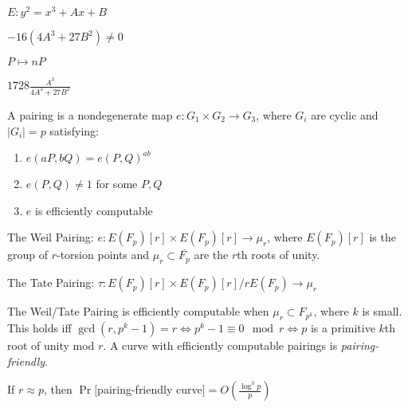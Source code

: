 \documentclass{article}
\newcommand\abs[1]{\left|#1\right|}
\begin{document}
$E: y^2 = x^3 + Ax + B$
\bigskip

$-16(4A^3+27B^2) \ne 0$

\bigskip

$P \mapsto n P$
\bigskip

$1728\frac{A^3}{4A^3+27B^2}$

\bigskip


\noindent A pairing is a nondegenerate map $e: G_1 \times G_2 \to G_3$, where $G_i$ are cyclic and $\abs{G_i} = p$ satisfying:
\begin{enumerate}
\item $e(aP, bQ) = e(P,Q)^{ab}$
\item $e(P,Q) \ne 1$ for some $P,Q$
\item $e$ is efficiently computable
\end{enumerate}

\bigskip

The Weil Pairing: $e: E(F_p)[r] \times E(F_p)[r] \to \mu_r$, where $E(F_p)[r]$ is the group of $r$-torsion points and $\mu_r \subset \overline{F_p}$ are the $r$th roots of unity.
\bigskip

The Tate Pairing: $\tau: E(F_p)[r] \times E(F_p)[r]/ rE(F_p) \to \mu_r$

\bigskip

The Weil/Tate Pairing is efficiently computable when $\mu_r \subset F_{p^k}$, where $k$ is small. This holds iff $\gcd(r,p^k-1) = r \iff p^k-1 \equiv 0 \mod r \iff p$ is a primitive $k$th root of unity mod $r$. A curve with efficiently computable pairings is {\it pairing-friendly}.

\bigskip

If $r \approx p$, then $\Pr[$pairing-friendly curve$] = O(\frac{\log^3 p}{p})$
\end{document}
